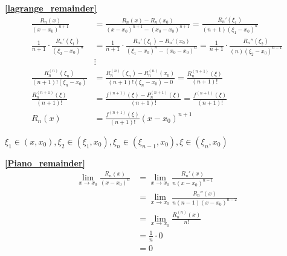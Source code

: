 \textbf{\large \ref{lagrange_remainder}}
\begin{align*}
    \frac{R_n(x)}{(x-x_0)^{n+1}}&=\frac{R_n(x)-R_n(x_0)}{(x-x_0)^{n+1}-(x_0-x_0)^{n+1}}=\frac{R_n'(\xi_1)}{(n+1)(\xi_1-x_0)^n}\\
    \frac{1}{n+1}\cdot\frac{R_n'(\xi_1)}{(\xi_2-x_0)^n}&=\frac{1}{n+1}\cdot\frac{R_n'(\xi_1)-R_n'(x_0)}{(\xi_1-x_0)^{n}-(x_0-x_0)^{n}}=\frac{1}{n+1}\cdot\frac{R_n''(\xi_2)}{(n)(\xi_2-x_0)^{n-1}}\\
    &\vdots\\
    \frac{R_n^{(n)}(\xi_n)}{(n+1)!(\xi_n-x_0)}&=\frac{R_n^{(n)}(\xi_n)-R_n^{(n)}(x_0)}{(n+1)!(\xi_n-x_0)-0}=\frac{R_n^{(n+1)}(\xi)}{(n+1)!}\\
    \frac{R_n^{(n+1)}(\xi)}{(n+1)!}&=\frac{f^{(n+1)}(\xi)-P_n^{(n+1)}(\xi)}{(n+1)!}=\frac{f^{(n+1)}(\xi)}{(n+1)!}\\
    R_n(x)&=\frac{f^{(n+1)}(\xi)}{(n+1)!}(x-x_0)^{n+1}
\end{align*}
\centerline{$\xi_1\in(x,x_0),\xi_2\in(\xi_1,x_0),\xi_n\in(\xi_{n-1},x_0),\xi\in(\xi_n,x_0)$}

\textbf{\large \ref{Piano_remainder}}
\begin{align*}
      \lim\limits_{x\to x_0}\frac{R_n(x)}{(x-x_0)^n}&=\lim\limits_{x\to x_0}\frac{R_n'(x)}{n(x-x_0)^{n-1}}\\
      &=\lim\limits_{x\to x_0}\frac{R_n''(x)}{n(n-1)(x-x_0)^{n-2}}\\
      &=\lim\limits_{x\to x_0}\frac{R_n^{(n)}(x)}{n!}\\
      &=\frac{1}{n}\cdot 0\\
      &=0
\end{align*}
